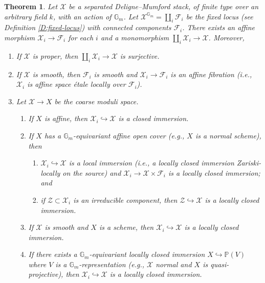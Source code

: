 \documentclass[a4paper]{amsart}
\theoremstyle{plain}
\newtheorem{theorem}{Theorem}[section]
\theoremstyle{definition}
\theoremstyle{remark}
\numberwithin{equation}{section}
\newcommand{\GG}{\mathbb{G}}
\newcommand{\PP}{\mathbb{P}}
\newcommand\cF{\mathcal{F}}
\newcommand\cX{\mathcal{X}}
\newcommand\cZ{\mathcal{Z}}
\begin{document}
\begin{theorem} \label{T:bb}
Let $\cX$ be a separated Deligne--Mumford stack, of finite type over an arbitrary field $k$, with an action of $\GG_m$.  Let $\cX^{\GG_m} = \coprod_i \cF_i$ be the fixed locus (see Definition \ref{D:fixed-locus}) with connected components $\cF_i$.  There exists an affine morphism $\cX_i \to \cF_i$ for each $i$ and a monomorphism $\coprod_i \cX_i \to \cX$.  Moreover,
\begin{enumerate}
\item \label{T:bb-proper}
	If $\cX$ is proper, then $\coprod_i \cX_i \to \cX$ is surjective.
\item \label{T:bb-smooth}
	If $\cX$ is smooth, then $\cF_i$ is smooth and $\cX_i \to \cF_i$ is an affine fibration (i.e., $\cX_i$ is affine space \'etale locally over $\cF_i$).
\item \label{T:bb-locally-closed}
	Let $\cX \to X$ be the coarse moduli space.
\begin{enumerate}
\item \label{T:bb-locally-closed-affine}
	If $X$ is affine, then $\cX_i \hookrightarrow \cX$ is a  closed immersion.
\item \label{T:bb-locally-affine}
	If $X$ has a $\GG_m$-equivariant affine open cover (e.g., $X$ is a normal scheme), then
\begin{enumerate}[label=(\roman*),ref=\roman*]
	\item \label{T:bb-locally-affine1} 
	$\cX_i \hookrightarrow \cX$ is a local immersion 
	(i.e., a locally closed immersion Zariski-locally on the source) and $\cX_i \to \cX \times \cF_i$ is a locally closed immersion; and
	\item \label{T:bb-locally-affine2} 
	if $\cZ \subset \cX_i$ is an irreducible component, then $\cZ \hookrightarrow \cX$ is a locally closed immersion.
\end{enumerate}
\item \label{T:bb-locally-closed-smooth-stack}
	If $\cX$ is smooth and $X$ is a scheme, then $\cX_i \hookrightarrow \cX$ is a locally closed immersion.
\item \label{T:bb-locally-closed-quasi-projective}
	If there exists a $\GG_m$-equivariant locally closed immersion $X \hookrightarrow \PP(V)$ where $V$ is a $\GG_m$-representation (e.g., $\cX$ normal and $X$ is quasi-projective), then $\cX_i \hookrightarrow \cX$ is a locally closed immersion.
\end{enumerate}
\end{enumerate}
\end{theorem}
\end{document}
